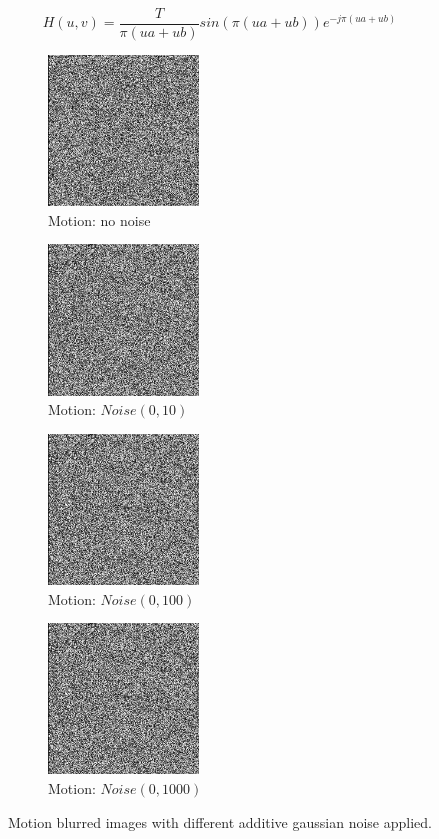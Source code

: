 \documentclass[letterpaper]{article}
\begin{document}
\begin{equation} \label{eq:motionmodel}
H(u,v)=\frac{T}{\pi (ua + ub)}sin(\pi (ua + ub))e^{-j\pi (ua + ub)}
\end{equation}
\begin{figure}[hbtp]
  \centering
  \begin{subfigure}{4cm}
    \includegraphics[width=4cm]{images/lenna_deblurred_inverse.png}
    \caption{Motion: no noise}
  \end{subfigure}
  \begin{subfigure}{4cm}
    \includegraphics[width=4cm]{images/lenna_deblurred_inverse_10.png}
    \caption{Motion: $Noise(0,10)$}
  \end{subfigure}
  \begin{subfigure}{4cm}
    \includegraphics[width=4cm]{images/lenna_deblurred_inverse_10.png}
    \caption{Motion: $Noise(0,100)$}
  \end{subfigure}
  \begin{subfigure}{4cm}
    \includegraphics[width=4cm]{images/lenna_deblurred_inverse_10.png}
    \caption{Motion: $Noise(0,1000)$}
  \end{subfigure}
  \caption{Motion blurred images with different additive gaussian noise applied.}
  \label{fig:inverse}
\end{figure}
\end{document}
